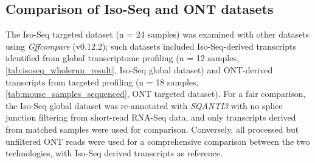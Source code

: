 \subsection{Comparison of Iso-Seq and ONT datasets}
The Iso-Seq targeted dataset (n = 24 samples) was examined with other datasets using \textit{Gffcompare}\cite{Pertea2020} (v0.12.2); such datasets included Iso-Seq-derived transcripts identified from global transcriptome profiling (n = 12 samples, \cref{tab:isoseq_wholerun_result}, Iso-Seq global dataset) and ONT-derived transcripts from targeted profiling (n = 18 samples, \cref{tab:mouse_samples_sequenced}, ONT targeted dataset). For a fair comparison, the Iso-Seq global dataset was re-annotated with \textit{SQANTI3} with no splice junction filtering from short-read RNA-Seq data, and only transcripts derived from matched samples were used for comparison. Conversely, all processed but unfiltered ONT reads were used for a comprehensive comparison between the two technologies, with Iso-Seq derived transcripts as reference. 

